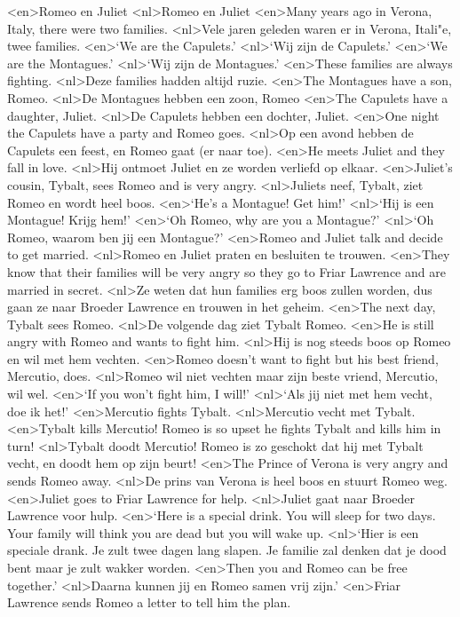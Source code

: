 <en>Romeo en Juliet
<nl>Romeo en Juliet
<en>Many years ago in Verona, Italy, there were two families.
<nl>Vele jaren geleden waren er in Verona, Itali"e, twee families.
<en>‘We are the Capulets.’
<nl>`Wij zijn de Capulets.'
<en>‘We are the Montagues.’
<nl>`Wij zijn de Montagues.'
<en>These families are always fighting. 
<nl>Deze families hadden altijd ruzie.
<en>The Montagues have a son, Romeo. 
<nl>De Montagues hebben een zoon, Romeo
<en>The Capulets have a daughter, Juliet.
<nl>De Capulets hebben een dochter, Juliet.
<en>One night the Capulets have a party and Romeo goes. 
<nl>Op een avond hebben de Capulets een feest, en Romeo gaat (er naar toe).
<en>He meets Juliet and they fall in love. 
<nl>Hij ontmoet Juliet en ze worden verliefd op elkaar.
<en>Juliet’s cousin, Tybalt, sees Romeo and is very angry.
<nl>Juliets neef, Tybalt, ziet Romeo en wordt heel boos.
<en>‘He’s a Montague! Get him!’
<nl>`Hij is een Montague! Krijg hem!'
<en>‘Oh Romeo, why are you a Montague?’
<nl>`Oh Romeo, waarom ben jij een Montague?'
<en>Romeo and Juliet talk and decide to get married.
<nl>Romeo en Juliet praten en besluiten te trouwen.
<en>They know that their families will be very angry so they go to Friar Lawrence and are married in secret.
<nl>Ze weten dat hun families erg boos zullen worden, dus gaan ze naar Broeder Lawrence en trouwen in het geheim.
<en>The next day, Tybalt sees Romeo. 
<nl>De volgende dag ziet Tybalt Romeo.
<en>He is still angry with Romeo and wants to fight him.
<nl>Hij is nog steeds boos op Romeo en wil met hem vechten.
<en>Romeo doesn’t want to fight but his best friend, Mercutio, does.
<nl>Romeo wil niet vechten maar zijn beste vriend, Mercutio, wil wel.
<en>‘If you won’t fight him, I will!’
<nl>`Als jij niet met hem vecht, doe ik het!'
<en>Mercutio fights Tybalt. 
<nl>Mercutio vecht met Tybalt.
<en>Tybalt kills Mercutio! Romeo is so upset he fights Tybalt and kills him in turn!
<nl>Tybalt doodt Mercutio! Romeo is zo geschokt dat hij met Tybalt vecht, en doodt hem op zijn beurt!
<en>The Prince of Verona is very angry and sends Romeo away. 
<nl>De prins van Verona is heel boos en stuurt Romeo weg.
<en>Juliet goes to Friar Lawrence for help.
<nl>Juliet gaat naar Broeder Lawrence voor hulp.
<en>‘Here is a special drink. You will sleep for two days. Your family will think you are dead but you will wake up. 
<nl>`Hier is een speciale drank. Je zult twee dagen lang slapen. Je familie zal denken dat je dood bent maar je zult wakker worden.
<en>Then you and Romeo can be free together.’
<nl>Daarna kunnen jij en Romeo samen vrij zijn.'
<en>Friar Lawrence sends Romeo a letter to tell him the plan. 
